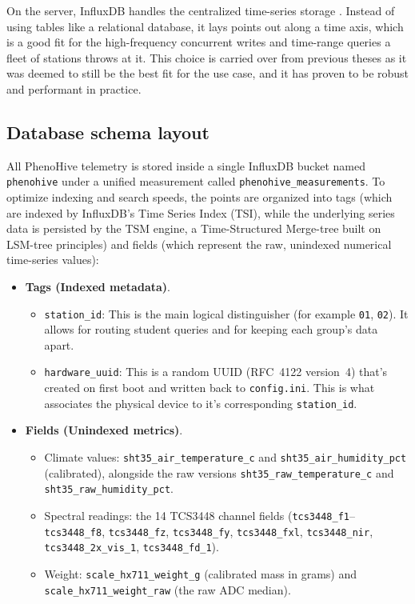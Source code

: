 On the server, InfluxDB handles the centralized time-series storage \parencite{influxdb-docs}. Instead of using tables like a relational database, it lays points out along a time axis, which is a good fit for the high-frequency concurrent writes and time-range queries a fleet of stations throws at it. This choice is carried over from previous theses as it was deemed to still be the best fit for the use case, and it has proven to be robust and performant in practice.

\subsection{Database schema layout}

All PhenoHive telemetry is stored inside a single InfluxDB bucket named \texttt{phenohive} under a unified measurement called \texttt{phenohive\_measurements}. To optimize indexing and search speeds, the points are organized into tags (which are indexed by InfluxDB's Time Series Index (TSI), while the underlying series data is persisted by the TSM engine, a Time-Structured Merge-tree built on LSM-tree principles) and fields (which represent the raw, unindexed numerical time-series values):

\begin{itemize}
    \item \textbf{Tags (Indexed metadata)}.
    \begin{itemize}
        \item \texttt{station\_id}: This is the main logical distinguisher (for example \texttt{01}, \texttt{02}). It allows for routing student queries and for keeping each group's data apart.
        \item \texttt{hardware\_uuid}: This is a random UUID (RFC~4122 version~4) that's created on first boot and written back to \texttt{config.ini}. This is what associates the physical device to it's corresponding \texttt{station\_id}.
    \end{itemize}
    \item \textbf{Fields (Unindexed metrics)}.
    \begin{itemize}
        \item Climate values: \texttt{sht35\_air\_temperature\_c} and \texttt{sht35\_air\_humidity\_pct} (calibrated), alongside the raw versions \texttt{sht35\_raw\_temperature\_c} and \texttt{sht35\_raw\_humidity\_pct}.
        \item Spectral readings: the 14 TCS3448 channel fields (\texttt{tcs3448\_f1}--\texttt{tcs3448\_f8}, \texttt{tcs3448\_fz}, \texttt{tcs3448\_fy}, \texttt{tcs3448\_fxl}, \texttt{tcs3448\_nir}, \texttt{tcs3448\_2x\_vis\_1}, \texttt{tcs3448\_fd\_1}).
        \item Weight: \texttt{scale\_hx711\_weight\_g} (calibrated mass in grams) and \texttt{scale\_hx711\_weight\_raw} (the raw ADC median).
    \end{itemize}
\end{itemize}

